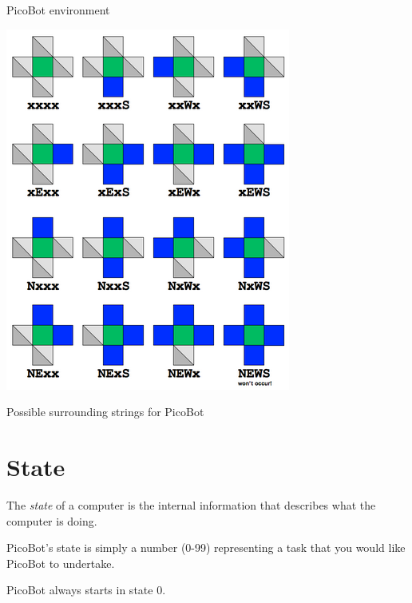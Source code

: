 \documentclass[8pt,a4paper,compress,handout]{beamer}
\begin{document}
\begin{frame}[fragile]
\begin{minipage}{100pt}
\begin{center}
\smallskip

\tiny PicoBot environment

\smallskip

\includegraphics[scale=0.25]{figures/picobot_surroundings.png}

\smallskip

\tiny Possible surrounding strings for PicoBot
\end{center}
\end{minipage}
\end{frame}

\section{State}
\begin{frame}[fragile]
The \emph{state} of a computer is the internal information that describes what the computer is doing.

\bigskip

PicoBot's state is simply a number (0-99) representing a task that you would like PicoBot to undertake.

\bigskip

PicoBot always starts in state 0.
\end{frame}
\end{document}
